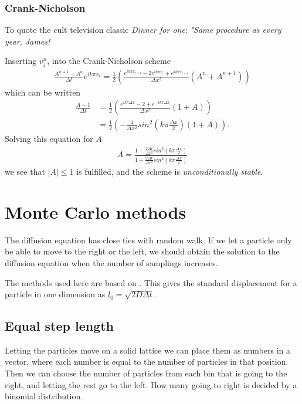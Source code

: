 \documentclass[11pt,a4paper,draft]{article}
\numberwithin{equation}{section}
\begin{document}
\subsubsection{Crank-Nicholson}
To quote the cult television classic \emph{Dinner for one}:  \emph{"Same procedure as every year, James!}

Inserting  $v^n_i$, into the Crank-Nicholson scheme
\begin{align*}
\frac{A^{n+1} - A^{n}}{\Delta t} e^{ik \pi x_i} = \frac{1}{2} \left( \frac{e^{ik \pi x_{i+1}}-2e^{ik \pi x_{i}} + e^{ik \pi x_{i-1}}}{\Delta x^2} (A^n + A^{n+1})  \right)
\end{align*}
which can be written 
\begin{align*}
\frac{A-1}{\Delta t} &= \frac{1}{2} \left( \frac{e^{ik \pi \Delta x} -2 + e^{-ik \pi \Delta x}}{\Delta x^2} (1 + A) \right) \\
&= \frac{1}{2} \left( -\frac{4}{\Delta x^2}sin^2\left(k\pi \frac{\Delta x}{2}\right)(1 + A) \right).
\end{align*}
Solving this equation for $A$
\begin{align*}
A = \frac{1-\frac{2\Delta t}{\Delta x^2}sin^2\left(k\pi \frac{\Delta x}{2}\right)}{1+\frac{2\Delta t}{\Delta x^2}sin^2\left(k\pi \frac{\Delta x}{2}\right)}
\end{align*}
we see that $|A| \leq 1$ is fulfilled, and the scheme is  \emph{unconditionally stable}.


\section{Monte Carlo methods}

The diffusion equation has close ties with random walk. If we let a 
particle only be able to move to the right or the left, we should obtain
the solution to the diffusion equation when the number of samplings 
increases.

The methods used here are based on \cite{farnell2005monte}. This gives 
the standard displacement for a particle in one dimension 
as $l_0 = \sqrt{2D\Delta t}$.

\subsection{Equal step length}
Letting the particles move on a solid lattice we can place them as 
numbers in a vector, where each number is equal to the number of 
particles in that position. Then we can choose the number of particles
from  each bin that is going to the right, and letting the rest go
to the left. 
How many going to right is decided by a binomial distribution.
\end{document}
